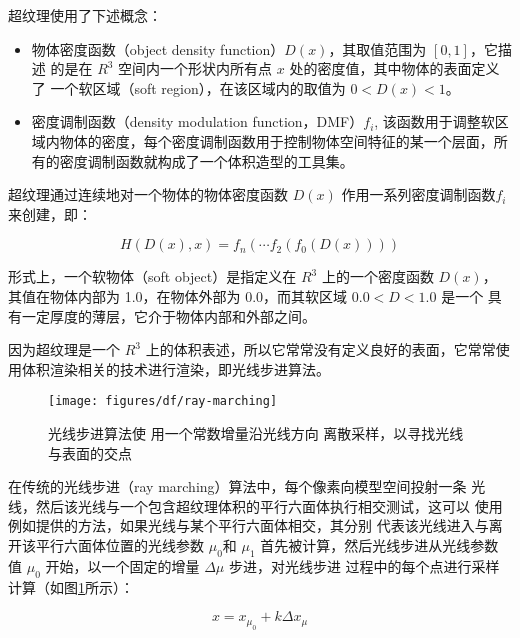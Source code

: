 超纹理使用了下述概念：

\begin{itemize}
	\item 物体密度函数（object density function）$D(x)$，其取值范围为 $[0,1]$，它描述 的是在 $R^{3}$ 空间内一个形状内所有点 $x$ 处的密度值，其中物体的表面定义了 一个软区域（soft region），在该区域内的取值为 $0 < D(x) < 1$。
	\item 密度调制函数（density modulation function，DMF）$f_i$, 该函数用于调整软区域内物体的密度，每个密度调制函数用于控制物体空间特征的某一个层面，所有的密度调制函数就构成了一个体积造型的工具集。
\end{itemize}

超纹理通过连续地对一个物体的物体密度函数 $D(x)$ 作用一系列密度调制函数$f_i$来创建，即：

\begin{equation}
	H(D(x),x)=f_n(\cdots f_2(f_0(D(x))))
\end{equation}

形式上，一个软物体（soft object）是指定义在 $R^{3}$ 上的一个密度函数 $D(x)$， 其值在物体内部为 1.0，在物体外部为 0.0，而其软区域 $0.0 < D < 1.0$ 是一个 具有一定厚度的薄层，它介于物体内部和外部之间。

因为超纹理是一个 $R^{3}$ 上的体积表述，所以它常常没有定义良好的表面，它常常使用体积渲染相关的技术进行渲染，即光线步进算法。

\begin{figure}
	\sidecaption
	\texttt{[image: figures/df/ray-marching]}
	\caption{光线步进算法使 用一个常数增量沿光线方向 离散采样，以寻找光线与表面的交点}
	\label{f:df-ray-marching}
\end{figure}

在传统的光线步进（ray marching）算法中，每个像素向模型空间投射一条 光线，然后该光线与一个包含超纹理体积的平行六面体执行相交测试，这可以 使用例如\cite{a:Onraytracingparametricsurfaces}提供的方法，如果光线与某个平行六面体相交，其分别 代表该光线进入与离开该平行六面体位置的光线参数 $\mu_0$和 $\mu_1$ 首先被计算，然后光线步进从光线参数值 $\mu_0$ 开始，以一个固定的增量 $\Delta\mu$ 步进，对光线步进 过程中的每个点进行采样计算（如图\ref{f:df-ray-marching}所示）：

\begin{equation}
	x=x_{\mu_0}+k\Delta x_{\mu}
\end{equation}


